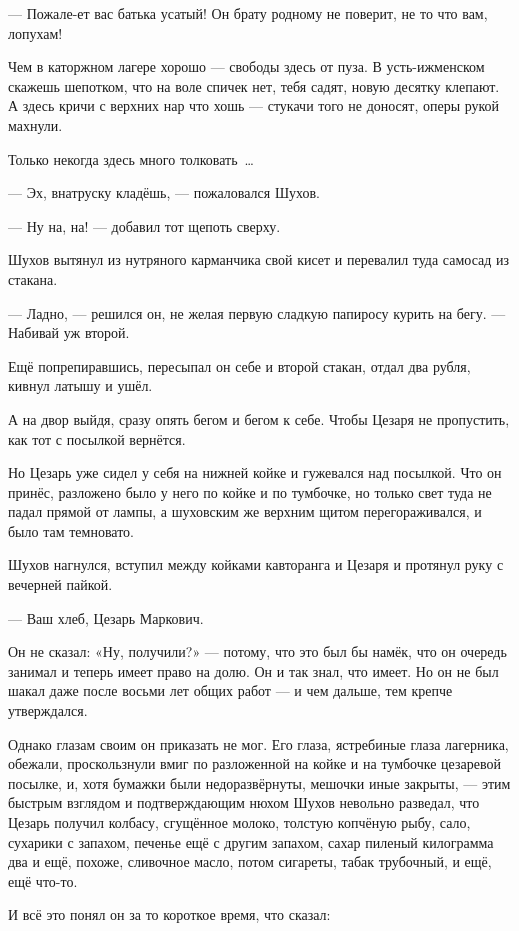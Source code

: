 --- Пожале-ет вас батька усатый! Он брату родному не поверит, не то что вам, лопухам!

Чем в каторжном лагере хорошо --- свободы здесь от пуза. В усть-ижменском скажешь шепотком, 
что на воле спичек нет, тебя садят, новую десятку клепают. А здесь кричи с верхних нар что 
хошь --- стукачи того не доносят, оперы рукой махнули.

Только некогда здесь много толковать~\dots{}

--- Эх, внатруску кладёшь, --- пожаловался Шухов.

--- Ну на, на! --- добавил тот щепоть сверху.

Шухов вытянул из нутряного карманчика свой кисет и перевалил туда самосад из стакана.

--- Ладно, --- решился он, не желая первую сладкую папиросу курить на бегу. --- Набивай уж второй.

Ещё попрепиравшись, пересыпал он себе и второй стакан, отдал два рубля, кивнул латышу и ушёл.

А на двор выйдя, сразу опять бегом и бегом к себе. Чтобы Цезаря не пропустить, как тот с 
посылкой вернётся.

Но Цезарь уже сидел у себя на нижней койке и гужевался над посылкой. Что он принёс, разложено 
было у него по койке и по тумбочке, но только свет туда не падал прямой от лампы, а шуховским 
же верхним щитом перегораживался, и было там темновато.

Шухов нагнулся, вступил между койками кавторанга и Цезаря и протянул руку с вечерней пайкой.

--- Ваш хлеб, Цезарь Маркович.

Он не сказал: «Ну, получили?» --- потому, что это был бы намёк, что он очередь занимал и теперь 
имеет право на долю. Он и так знал, что имеет. Но он не был шакал даже после восьми лет общих 
работ --- и чем дальше, тем крепче утверждался.

Однако глазам своим он приказать не мог. Его глаза, ястребиные глаза лагерника, обежали, 
проскользнули вмиг по разложенной на койке и на тумбочке цезаревой посылке, и, хотя бумажки 
были недоразвёрнуты, мешочки иные закрыты, --- этим быстрым взглядом и подтверждающим нюхом 
Шухов невольно разведал, что Цезарь получил колбасу, сгущённое молоко, толстую копчёную 
рыбу, сало, сухарики с запахом, печенье ещё с другим запахом, сахар пиленый килограмма два и 
ещё, похоже, сливочное масло, потом сигареты, табак трубочный, и ещё, ещё что-то.

И всё это понял он за то короткое время, что сказал:

